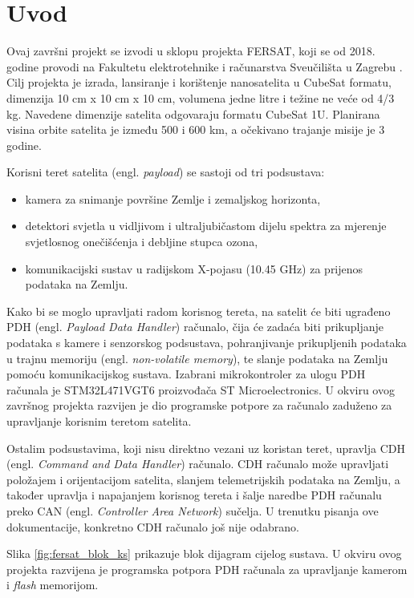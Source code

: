 \chapter{Uvod}

Ovaj završni projekt se izvodi u sklopu projekta FERSAT, koji se od 2018. godine provodi na Fakultetu elektrotehnike i računarstva Sveučilišta u Zagrebu \cite{fersat_stranica_projekta}. Cilj projekta je izrada, lansiranje i korištenje nanosatelita u CubeSat formatu, dimenzija 10 cm x 10 cm x 10 cm, volumena jedne litre i težine ne veće od 4/3 kg. Navedene dimenzije satelita odgovaraju formatu CubeSat 1U. Planirana visina orbite satelita je između 500 i 600 km, a očekivano trajanje misije je 3 godine. 
 
Korisni teret satelita (engl. \textit{payload}) se sastoji od tri podsustava:

\begin{itemize}
	\item kamera za snimanje površine Zemlje i zemaljskog horizonta,
	\item detektori svjetla u vidljivom i ultraljubičastom dijelu spektra za mjerenje svjetlosnog onečišćenja i debljine stupca ozona,
	\item komunikacijski sustav u radijskom X-pojasu (10.45 GHz) za prijenos podataka na Zemlju.
\end{itemize}

Kako bi se moglo upravljati radom korisnog tereta, na satelit će biti ugrađeno PDH (engl. \textit{Payload Data Handler}) računalo, čija će zadaća biti prikupljanje podataka s kamere i senzorskog podsustava, pohranjivanje prikupljenih podataka u trajnu memoriju (engl. \textit{non-volatile memory}), te slanje podataka na Zemlju pomoću komunikacijskog sustava. Izabrani mikrokontroler za ulogu PDH računala je STM32L471VGT6 proizvođača ST Microelectronics.
U okviru ovog završnog projekta razvijen je dio programske potpore za računalo zaduženo za upravljanje korisnim teretom satelita.

Ostalim podsustavima, koji nisu direktno vezani uz koristan teret, upravlja CDH (engl. \textit{Command and Data Handler}) računalo. CDH računalo može upravljati položajem i orijentacijom satelita, slanjem telemetrijskih podataka na Zemlju, a također upravlja i napajanjem korisnog tereta i šalje naredbe PDH računalu preko CAN (engl. \textit{Controller Area Network}) sučelja. U trenutku pisanja ove dokumentacije, konkretno CDH računalo još nije odabrano.
    
Slika \ref{fig:fersat_blok_ks} prikazuje blok dijagram cijelog sustava. U okviru ovog projekta razvijena je programska potpora PDH računala za upravljanje kamerom i \textit{flash} memorijom.

